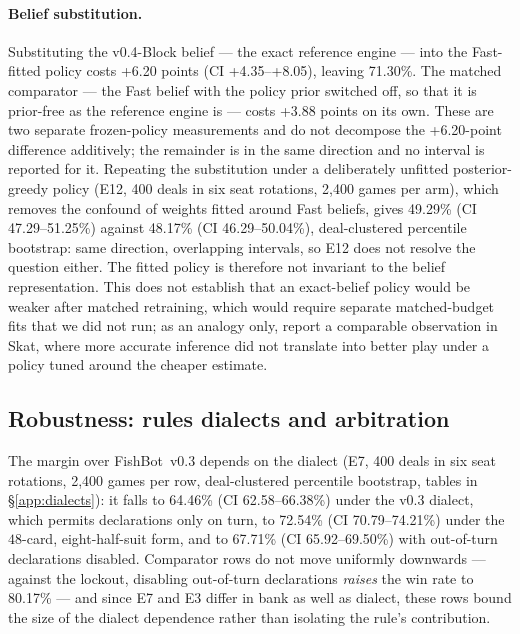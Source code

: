 \documentclass[11pt]{article}
\theoremstyle{definition}
\DeclareRobustCommand{\vblock}{\texorpdfstring{\mbox{v0.4-Block}}{v0.4-Block}}
\DeclareRobustCommand{\vthree}{\texorpdfstring{\mbox{FishBot v0.3}}{FishBot v0.3}}
\newcommand{\numAblBlock}{+6.20}
\newcommand{\numAblBlockCI}{+4.35--+8.05}
\newcommand{\numAblPrior}{+3.88}
\newcommand{\numETwelveFast}{49.29}
\newcommand{\numETwelveFastCI}{47.29--51.25}
\newcommand{\numETwelveBlock}{48.17}
\newcommand{\numETwelveBlockCI}{46.29--50.04}
\newcommand{\numEsevenDeals}{400}
\newcommand{\numEsevenGames}{2{,}400}
\newcommand{\numETwelveDeals}{400}
\newcommand{\numETwelveGames}{2{,}400}
\newcommand{\numAblBlockAbs}{71.30}
\newcommand{\numEsevenVthreeLegacy}{64.46}
\newcommand{\numEsevenVthreeLegacyCI}{62.58--66.38}
\newcommand{\numEsevenVthreeEight}{72.54}
\newcommand{\numEsevenVthreeEightCI}{70.79--74.21}
\newcommand{\numEsevenVthreeNoOOT}{67.71}
\newcommand{\numEsevenVthreeNoOOTCI}{65.92--69.50}
\newcommand{\numEsevenLockoutNoOOT}{80.17}
\begin{document}
\paragraph{Belief substitution.}
Substituting the \vblock{} belief --- the exact reference engine --- into the
Fast-fitted policy costs \numAblBlock{} points (CI \numAblBlockCI{}), leaving
\numAblBlockAbs\%. The matched comparator --- the Fast belief with the policy
prior switched off, so that it is prior-free as the reference engine is --- costs
\numAblPrior{} points on its own. These are two separate frozen-policy measurements and do not
decompose the \numAblBlock{}-point difference additively; the remainder is in the
same direction and no interval is reported for it. Repeating the substitution
under a deliberately unfitted posterior-greedy policy (E12, \numETwelveDeals{}
deals in six seat rotations, \numETwelveGames{} games per arm), which removes the
confound of weights fitted around Fast beliefs, gives \numETwelveFast\% (CI
\numETwelveFastCI\%) against \numETwelveBlock\% (CI \numETwelveBlockCI\%),
deal-clustered percentile bootstrap: same direction, overlapping intervals, so
E12 does not resolve the question either. The fitted policy is therefore not
invariant to the belief representation. This does not establish that an
exact-belief policy would be weaker after matched retraining, which would require
separate matched-budget fits that we did not run; as an analogy only,
\cite{rebstock-inference} report a comparable observation in Skat, where more
accurate inference did not translate into better play under a policy tuned around
the cheaper estimate.

\subsection{Robustness: rules dialects and arbitration}
\label{sec:robustness}

The margin over \vthree{} depends on the dialect (E7, \numEsevenDeals{} deals in
six seat rotations, \numEsevenGames{} games per row, deal-clustered percentile
bootstrap, tables in \S\ref{app:dialects}): it falls to \numEsevenVthreeLegacy\%
(CI \numEsevenVthreeLegacyCI\%) under the v0.3 dialect, which permits declarations
only on turn, to \numEsevenVthreeEight\% (CI \numEsevenVthreeEightCI\%) under the
$48$-card, eight-half-suit form, and to \numEsevenVthreeNoOOT\% (CI
\numEsevenVthreeNoOOTCI\%) with out-of-turn declarations disabled. Comparator rows
do not move uniformly downwards --- against the lockout, disabling out-of-turn
declarations \emph{raises} the win rate to \numEsevenLockoutNoOOT\% --- and since
E7 and E3 differ in bank as well as dialect, these rows bound the size of the
dialect dependence rather than isolating the rule's contribution.
\end{document}
